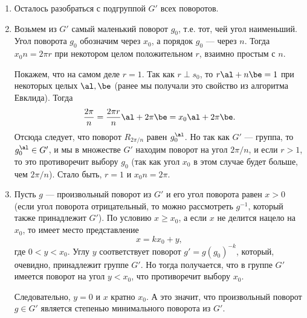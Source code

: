 \begin{enumerate}
\item Осталось разобраться с подгруппой $G'$ всех поворотов.
\item Возьмем из $G'$ самый маленький поворот $g_0$, т.е. тот, чей угол наименьший. Угол поворота $g_0$ обозначим через $x_0$, а порядок $g_0$ --- через $n$. Тогда $x_0n=2\pi r$ при некотором целом положительном $r$, взаимно простым с $n$.

Покажем, что на самом деле $r=1$. Так как $r\perp s_0$, то $r\al+n\be=1$ при некоторых целых $\al,\be$ (ранее мы получали это свойство из алгоритма Евклида). Тогда
$$
\frac{2\pi}{n} = \frac{2\pi r}{n}\al + 2\pi\be = x_0\al + 2\pi\be.
$$
Отсюда следует, что поворот $R_{2\pi/n}$ равен $g_0^\al$. Но так как $G'$ --- группа, то $g_0^\al\in G'$, и мы в множестве $G'$ находим поворот на угол $2\pi/n$, и если $r>1$, то это противоречит выбору $g_0$ (так как угол $x_0$ в этом случае будет больше, чем $2\pi/n$). Стало быть, $r=1$ и $x_0n=2\pi$.

\item Пусть $g$ --- произвольный поворот из $G'$ и его угол поворота равен $x>0$ (если угол поворота отрицательный, то можно рассмотреть $g^{-1}$, который также принадлежит $G'$). По условию $x\ge x_0$, а если $x$ не делится нацело на $x_0$, то имеет место представление
$$
x = kx_0+y,
$$
где $0<y<x_0$. Углу $y$ соответствует поворот $g'=g(g_0)^{-k}$, который, очевидно, принадлежит группе $G'$. Но тогда получается, что в группе $G'$ имеется поворот на угол $y<x_0$, что противоречит выбору $x_0$.

Следовательно, $y=0$ и $x$ кратно $x_0$. А это значит, что произвольный поворот $g\in G'$ является степенью минимального поворота из $G'$.


\end{enumerate}
